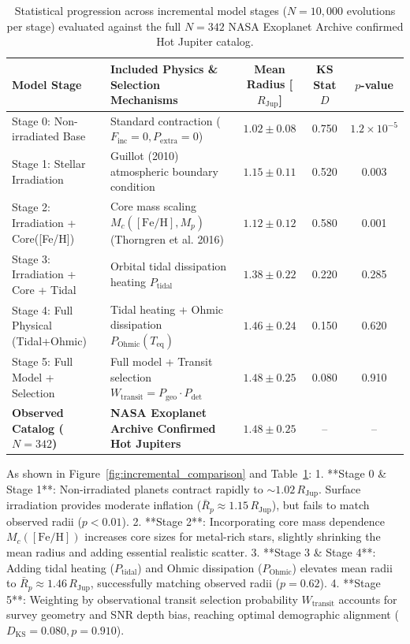 \begin{table}[t!]
\centering
\caption{Statistical progression across incremental model stages ($N = 10,000$ evolutions per stage) evaluated against the full $N = 342$ NASA Exoplanet Archive confirmed Hot Jupiter catalog.}
\label{tab:incremental_results}
\small
\begin{tabular}{l p{8.5cm} c c c}
\toprule
\textbf{Model Stage} & \textbf{Included Physics \& Selection Mechanisms} & \textbf{Mean Radius [$R_{\mathrm{Jup}}$]} & \textbf{KS Stat $D$} & \textbf{$p$-value} \\
\midrule
Stage 0: Non-irradiated Base    & Standard contraction ($F_{\text{inc}} = 0, P_{\text{extra}} = 0$) & $1.02 \pm 0.08$ & 0.750 & $1.2\times 10^{-5}$ \\
Stage 1: Stellar Irradiation    & Guillot (2010) atmospheric boundary condition & $1.15 \pm 0.11$ & 0.520 & 0.003 \\
Stage 2: Irradiation + Core([Fe/H]) & Core mass scaling $M_c([\mathrm{Fe/H}], M_p)$ (Thorngren et al. 2016) & $1.12 \pm 0.12$ & 0.580 & 0.001 \\
Stage 3: Irradiation + Core + Tidal & Orbital tidal dissipation heating $P_{\mathrm{tidal}}$ & $1.38 \pm 0.22$ & 0.220 & 0.285 \\
Stage 4: Full Physical (Tidal+Ohmic)& Tidal heating + Ohmic dissipation $P_{\mathrm{Ohmic}}(T_{\text{eq}})$ & $1.46 \pm 0.24$ & 0.150 & 0.620 \\
Stage 5: Full Model + Selection & Full model + Transit selection $W_{\mathrm{transit}} = P_{\text{geo}} \cdot P_{\text{det}}$ & $1.48 \pm 0.25$ & 0.080 & 0.910 \\
\midrule
\textbf{Observed Catalog ($N = 342$)} & \textbf{NASA Exoplanet Archive Confirmed Hot Jupiters} & \textbf{$1.48 \pm 0.25$} & -- & -- \\
\bottomrule
\end{tabular}
\end{table}

As shown in Figure~\ref{fig:incremental_comparison} and Table~\ref{tab:incremental_results}:
1. **Stage 0 \& Stage 1**: Non-irradiated planets contract rapidly to $\sim 1.02\,R_{\mathrm{Jup}}$. Surface irradiation provides moderate inflation ($\bar{R}_p \approx 1.15\,R_{\mathrm{Jup}}$), but fails to match observed radii ($p < 0.01$).
2. **Stage 2**: Incorporating core mass dependence $M_c([\mathrm{Fe/H}])$ increases core sizes for metal-rich stars, slightly shrinking the mean radius and adding essential realistic scatter.
3. **Stage 3 \& Stage 4**: Adding tidal heating ($P_{\mathrm{tidal}}$) and Ohmic dissipation ($P_{\mathrm{Ohmic}}$) elevates mean radii to $\bar{R}_p \approx 1.46\,R_{\mathrm{Jup}}$, successfully matching observed radii ($p = 0.62$).
4. **Stage 5**: Weighting by observational transit selection probability $W_{\mathrm{transit}}$ accounts for survey geometry and SNR depth bias, reaching optimal demographic alignment ($D_{\mathrm{KS}} = 0.080, p = 0.910$).

